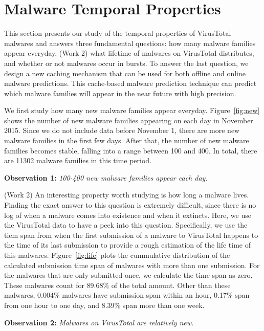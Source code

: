 \section{Malware Temporal Properties}
\label{sec:temporal}

This section presents our study of the temporal properties of VirusTotal malwares
and answers three fundamental questions: 
how many malware families appear everyday, 
{\color{red} (Work 2)
what lifetime of malwares on VirusTotal distributes,  
}
and whether or not malwares occur in bursts.
To answer the last question, we design a new caching mechanism 
that can be used for both offline and online malware predictions.
This cache-based malware prediction technique can predict which malware families will appear in the near future with high precision.



We first study how many new malware families appear everyday. 
Figure~\ref{fig:new} shows the number of new malware families appearing on each day in November 2015. 
Since we do not include data before November 1, 
there are more new malware families in the first few days.
After that, the number of new malware families becomes stable, 
falling into a range between 100 and 400. 
In total, there are 11302 malware families in this time period. 

{\bf Observation 1:} 
{\em 100-400 new malware families appear each day.}

%
%


{\color{red} (Work 2)
An interesting property worth studying is how long a malware lives. 
Finding the exact answer to this question is extremely difficult, since there 
is no log of when a malware comes into existence and when it extincts.
Here, we use the VirusTotal data to have a peek into this question.
Specifically, we use the tiem span from when the first submission of a malware to VirusTotal happens
to the time of its last submission
to provide a rough estimation of the life time of this malwares.
Figure~\ref{fig:life} plots the cummulative distribution of the calculated submission time span of malwares with more than one submission.
For the malwares that are only submitted once, we calculate the time span as zero.
These malwares count for 89.68\% of the total amount.
Other than these malwares, 0.004\% malwares have submission span within an hour, 
0.17\% span from one hour to one day, and 8.39\% span more than one week.


{\bf Observation 2:}
{\em Malwares on VirusTotal are relatively new. } %

}


